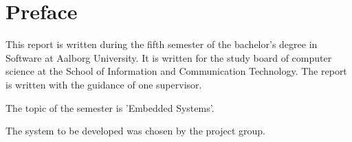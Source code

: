 \chapter*{Preface}
This report is written during the fifth semester of the bachelor's degree in Software at Aalborg University.
It is written for the study board of computer science at the School of Information and Communication Technology.
The report is written with the guidance of one supervisor.

The topic of the semester is 'Embedded Systems'.

The system to be developed was chosen by the project group.



\newpage